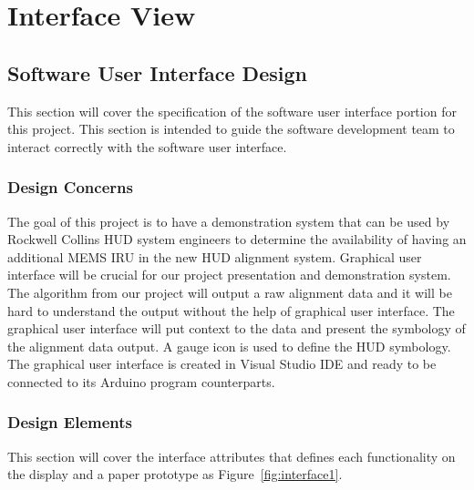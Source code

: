 
\section{Interface View}
	\subsection{Software User Interface Design}
	This section will cover the specification of the software user interface portion for this project. This section is intended to guide the software development team to interact correctly with the software user interface.\\

		\subsubsection{Design Concerns}
		The goal of this project is to have a demonstration system that can be used by Rockwell Collins HUD system engineers to determine the availability of having an additional MEMS IRU in the new HUD alignment system. Graphical user interface will be crucial for our project presentation and demonstration system. The algorithm from our project will output a raw alignment data and it will be hard to understand the output without the help of graphical user interface. The graphical user interface will put context to the data and present the symbology of the alignment data output. A gauge icon is used to define the HUD symbology. The graphical user interface is created in Visual Studio IDE and ready to be connected to its Arduino program counterparts.\\

		\subsubsection{Design Elements}
		This section will cover the interface attributes that defines each functionality on the display and a paper prototype as Figure~\ref{fig:interface1}.

